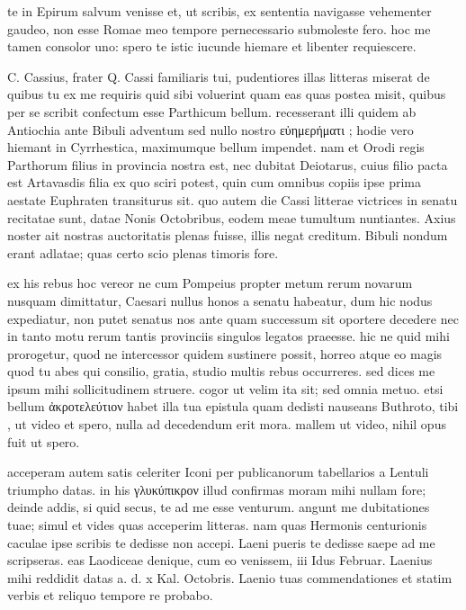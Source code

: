 


 te in Epirum salvum venisse et, ut scribis, ex sententia navigasse vehementer gaudeo, non esse Romae meo tempore pernecessario submoleste fero. hoc me tamen consolor uno: spero te istic iucunde hiemare et libenter requiescere.

 C. Cassius, frater Q. Cassi familiaris tui, pudentiores illas litteras miserat de quibus tu ex me requiris quid sibi voluerint quam eas quas postea misit, quibus per se scribit confectum esse Parthicum bellum. recesserant illi quidem ab Antiochia ante Bibuli adventum sed nullo nostro εὐημερήματι ; hodie vero hiemant in Cyrrhestica, maximumque bellum impendet. nam et Orodi regis Parthorum filius in provincia nostra est, nec dubitat Deiotarus, cuius filio pacta est Artavasdis filia ex quo sciri potest, quin cum omnibus copiis ipse prima aestate Euphraten transiturus sit. quo autem die Cassi litterae victrices in senatu recitatae sunt, datae Nonis Octobribus, eodem meae tumultum nuntiantes. Axius noster ait nostras auctoritatis plenas fuisse, illis negat creditum. Bibuli nondum erant adlatae; quas certo scio plenas timoris fore.

 ex his rebus hoc vereor ne cum Pompeius propter metum rerum novarum nusquam dimittatur, Caesari nullus honos a senatu habeatur, dum hic nodus expediatur, non putet senatus nos ante quam successum sit oportere decedere nec in tanto motu rerum tantis provinciis singulos legatos praeesse. hic ne quid mihi prorogetur, quod ne intercessor quidem sustinere possit, horreo atque eo magis quod tu abes qui consilio, gratia, studio multis rebus occurreres. sed dices me ipsum mihi sollicitudinem struere. cogor ut velim ita sit; sed omnia metuo. etsi bellum ἀκροτελεύτιον habet illa tua epistula quam dedisti nauseans Buthroto, tibi , ut video et spero, nulla ad decedendum erit mora. mallem ut video, nihil opus fuit ut spero.

 acceperam autem satis celeriter Iconi per publicanorum tabellarios a Lentuli triumpho datas. in his γλυκύπικρον illud confirmas moram mihi nullam fore; deinde addis, si quid secus, te ad me esse venturum. angunt me dubitationes tuae; simul et vides quas acceperim litteras. nam quas Hermonis centurionis caculae ipse scribis te dedisse non accepi. Laeni pueris te dedisse saepe ad me scripseras. eas Laodiceae denique, cum eo venissem, iii Idus Februar. Laenius mihi reddidit datas a. d. x Kal. Octobris. Laenio tuas commendationes et statim verbis et reliquo tempore re probabo.

